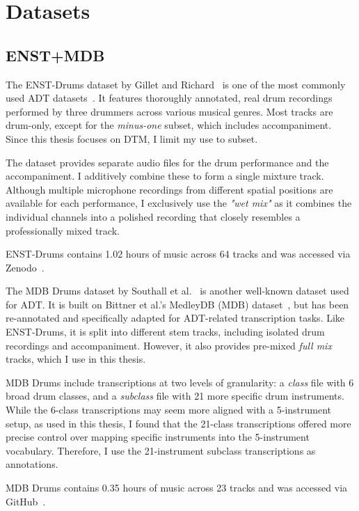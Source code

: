 \chapter{Datasets}\label{Datasets}

\section{ENST+MDB}

The ENST-Drums dataset by Gillet and Richard~\cite{gillet2006enst} is one of the most commonly used \gls{ADT} datasets~\cite{8350302}. It features thoroughly annotated, real drum recordings performed by three drummers across various musical genres. Most tracks are drum-only, except for the \textit{minus-one} subset, which includes accompaniment. Since this thesis focuses on \gls{DTM}, I limit my use to subset.

The dataset provides separate audio files for the drum performance and the accompaniment. I additively combine these to form a single mixture track. Although multiple microphone recordings from different spatial positions are available for each performance, I exclusively use the \textit{"wet mix"} as it combines the individual channels into a polished recording that closely resembles a professionally mixed track.

ENST-Drums contains 1.02 hours of music across 64 tracks and was accessed via Zenodo~\cite{gillet_2006_7432188}.

The MDB Drums dataset by Southall et al.~\cite{southall2017mdb} is another well-known dataset used for \gls{ADT}. It is built on Bittner et al.'s MedleyDB (MDB) dataset~\cite{bittner2014medleydb}, but has been re-annotated and specifically adapted for \gls{ADT}-related transcription tasks. Like ENST-Drums, it is split into different stem tracks, including isolated drum recordings and accompaniment. However, it also provides pre-mixed \textit{full mix} tracks, which I use in this thesis.

MDB Drums include transcriptions at two levels of granularity: a \textit{class} file with 6 broad drum classes, and a \textit{subclass} file with 21 more specific drum instruments. While the 6-class transcriptions may seem more aligned with a 5-instrument setup, as used in this thesis, I found that the 21-class transcriptions offered more precise control over mapping specific instruments into the 5-instrument vocabulary. Therefore, I use the 21-instrument subclass transcriptions as annotations.

MDB Drums contains 0.35 hours of music across 23 tracks and was accessed via GitHub~\cite{southall_mdbdrums_2017}.

